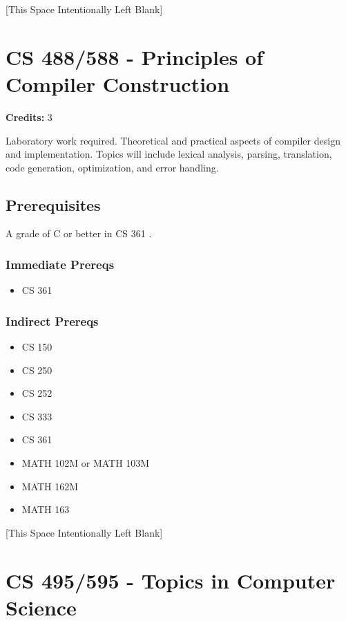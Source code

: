 \documentclass[]{article}
\providecommand{\tightlist}{%
  \setlength{\itemsep}{0pt}\setlength{\parskip}{0pt}}
\newcommand{\pagebreakhere}{
\vspace*{\fill}
\begin{center}
[This Space Intentionally Left Blank]
\end{center}
\vspace*{\fill}
\newpage
}
\begin{document}
\pagebreakhere
\section{CS 488/588 - Principles of Compiler
Construction}\label{cs-488588---principles-of-compiler-construction}

\textbf{Credits:} 3

Laboratory work required. Theoretical and practical aspects of compiler
design and implementation. Topics will include lexical analysis,
parsing, translation, code generation, optimization, and error handling.

\subsection{Prerequisites}\label{prerequisites-51}

A grade of C or better in CS 361 .

\subsubsection{Immediate Prereqs}\label{immediate-prereqs-42}

\begin{itemize}
\tightlist
\item
  CS 361
\end{itemize}

\subsubsection{Indirect Prereqs}\label{indirect-prereqs-42}

\begin{itemize}
\tightlist
\item
  CS 150
\item
  CS 250
\item
  CS 252
\item
  CS 333
\item
  CS 361
\item
  MATH 102M or MATH 103M
\item
  MATH 162M
\item
  MATH 163
\end{itemize}

\pagebreakhere
\section{CS 495/595 - Topics in Computer
Science}\label{cs-495595---topics-in-computer-science}
\end{document}
